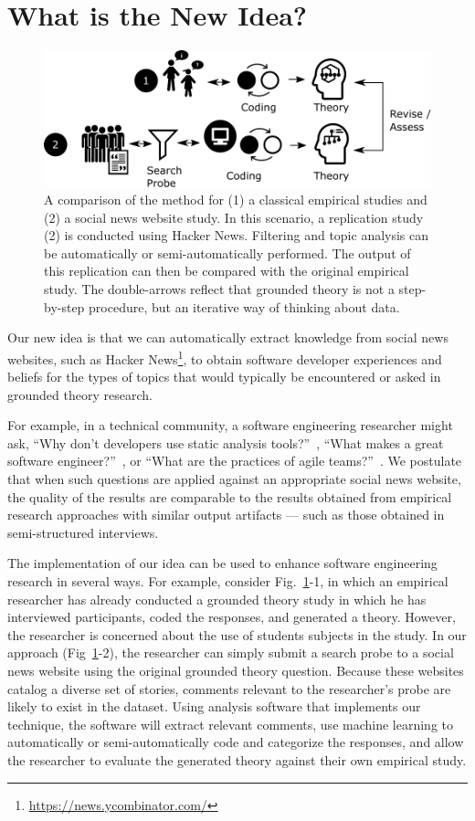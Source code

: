 \documentclass{sig-alternate}
\begin{document}
\section{What is the New Idea?}

\begin{figure}
\centering
\includegraphics[width=\linewidth]{concept}
\caption{A comparison of the method for (1) a classical empirical studies and (2) a social news website study. In this scenario, a replication study (2) is conducted using Hacker News. Filtering and topic analysis can be automatically or semi-automatically performed. The output of this replication can then be compared with the original empirical study. The double-arrows reflect that grounded theory is not a step-by-step procedure, but an iterative way of thinking about data.\label{fig:concept}}
\end{figure}

Our new idea is that we can automatically extract knowledge from social news websites, such as Hacker News\footnote{\url{https://news.ycombinator.com/}}, to obtain software developer experiences and beliefs for the types of topics that would typically be encountered or asked in grounded theory research.

For example, in a technical community, a software engineering researcher might ask, ``Why don't developers use static analysis tools?''~\cite{Johnson2013a}, ``What makes a great software engineer?''~\cite{Li2015}, or ``What are the practices of agile teams?''~\cite{Hoda2011}. We postulate that when such questions are applied against an appropriate social news website, the quality of the results are comparable to the results obtained from empirical research approaches with similar output artifacts --- such as those obtained in semi-structured interviews.

The implementation of our idea can be used to enhance software engineering research in several ways.  For example, consider Fig.~\ref{fig:concept}-1, in which an empirical researcher has already conducted a grounded theory study in which he has interviewed participants, coded the responses, and generated a theory. However, the researcher is concerned about the use of students subjects in the study. In our approach (Fig~\ref{fig:concept}-2), the researcher can simply submit a search probe to a social news website using the original grounded theory question. Because these websites catalog a diverse set of stories, comments relevant to the researcher's probe are likely to exist in the dataset. Using analysis software that implements our technique, the software will extract relevant comments, use machine learning to automatically or semi-automatically code and categorize the responses, and allow the researcher to evaluate the generated theory against their own empirical study.
\end{document}
